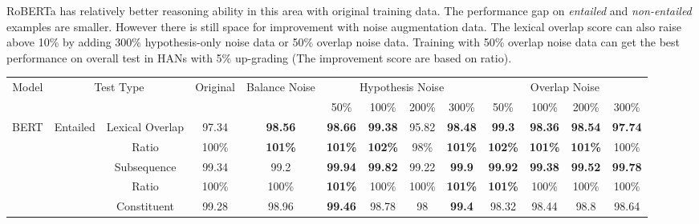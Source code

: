 RoBERTa has relatively better reasoning ability in this area with original training data. 
The performance gap on \textit{entailed} and \textit{non-entailed} examples are smaller. 
However there is still space for improvement with noise augmentation data. 
The lexical overlap score can also raise above 10\% by adding 300\% hypothesis-only noise data 
or 50\% overlap noise data. Training with 50\% overlap noise data can get 
the best performance on overall test in HANs with 5\% up-grading (The improvement 
score are based on ratio). 





\begin{table}[]
\centering
\scriptsize
\begin{tabular}{|c|c|c|c|c|c|c|c|c|c|c|c|c|}
\hline
\multirow{2}{*}{Model}    & \multicolumn{2}{c|}{\multirow{2}{*}{Test Type}} & \multirow{2}{*}{Original} & \multirow{2}{*}{Balance Noise} & \multicolumn{4}{c|}{Hypothesis Noise} & \multicolumn{4}{c|}{Overlap Noise} \\ \cline{6-13} 
                          & \multicolumn{2}{c|}{}                           &                           &                                & 50\%    & 100\%   & 200\%   & 300\%   & 50\%    & 100\%  & 200\%  & 300\%  \\ \hline
\multirow{14}{*}{BERT}    & \multirow{6}{*}{Entailed}     & Lexical Overlap & 97.34                     & \bf 98.56                          & \bf 98.66   & \bf 99.38   & 95.82   & \bf 98.48   & \bf 99.3    &\bf 98.36  & \bf 98.54  & \bf 97.74  \\ \cline{3-13} 
                          &                               & Ratio           & 100\%                     & \bf 101\%                          & \bf 101\%   & \bf 102\%   & 98\%    & \bf 101\%   & \bf 102\%   &\bf 101\%  & \bf 101\%  & 100\%  \\ \cline{3-13} 
                          &                               & Subsequence     & 99.34                     & 99.2                           & \bf 99.94   & \bf 99.82   & 99.22   & \bf 99.9    & \bf 99.92   & \bf 99.38  & \bf 99.52  & \bf 99.78  \\ \cline{3-13} 
                          &                               & Ratio           & 100\%                     & 100\%                          & \bf 101\%   & 100\%   & 100\%   & \bf 101\%   & \bf 101\%   & 100\%  & 100\%  & 100\%  \\ \cline{3-13} 
                          &                               & Constituent     & 99.28                     & 98.96                          & \bf 99.46   & 98.78   & 98      & \bf 99.4    & 98.32   & 98.44  & 98.8   & 98.64  \\ \cline{3-13} 

\end{tabular}
\end{table}
